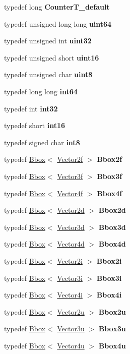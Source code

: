 \begin{DoxyCompactItemize}
typedef long {\bfseries Counter\+T\+\_\+default}
\item 
typedef unsigned long long {\bfseries uint64}
\item 
typedef unsigned int {\bfseries uint32}
\item 
typedef unsigned short {\bfseries uint16}
\item 
typedef unsigned char {\bfseries uint8}
\item 
typedef long long {\bfseries int64}
\item 
typedef int {\bfseries int32}
\item 
typedef short {\bfseries int16}
\item 
typedef signed char {\bfseries int8}
\item 
typedef \hyperlink{structcugar_1_1_bbox}{Bbox}$<$ \hyperlink{structcugar_1_1_vector}{Vector2f} $>$ {\bfseries Bbox2f}
\item 
typedef \hyperlink{structcugar_1_1_bbox}{Bbox}$<$ \hyperlink{structcugar_1_1_vector}{Vector3f} $>$ {\bfseries Bbox3f}
\item 
typedef \hyperlink{structcugar_1_1_bbox}{Bbox}$<$ \hyperlink{structcugar_1_1_vector}{Vector4f} $>$ {\bfseries Bbox4f}
\item 
typedef \hyperlink{structcugar_1_1_bbox}{Bbox}$<$ \hyperlink{structcugar_1_1_vector}{Vector2d} $>$ {\bfseries Bbox2d}
\item 
typedef \hyperlink{structcugar_1_1_bbox}{Bbox}$<$ \hyperlink{structcugar_1_1_vector}{Vector3d} $>$ {\bfseries Bbox3d}
\item 
typedef \hyperlink{structcugar_1_1_bbox}{Bbox}$<$ \hyperlink{structcugar_1_1_vector}{Vector4d} $>$ {\bfseries Bbox4d}
\item 
typedef \hyperlink{structcugar_1_1_bbox}{Bbox}$<$ \hyperlink{structcugar_1_1_vector}{Vector2i} $>$ {\bfseries Bbox2i}
\item 
typedef \hyperlink{structcugar_1_1_bbox}{Bbox}$<$ \hyperlink{structcugar_1_1_vector}{Vector3i} $>$ {\bfseries Bbox3i}
\item 
typedef \hyperlink{structcugar_1_1_bbox}{Bbox}$<$ \hyperlink{structcugar_1_1_vector}{Vector4i} $>$ {\bfseries Bbox4i}
\item 
typedef \hyperlink{structcugar_1_1_bbox}{Bbox}$<$ \hyperlink{structcugar_1_1_vector}{Vector2u} $>$ {\bfseries Bbox2u}
\item 
typedef \hyperlink{structcugar_1_1_bbox}{Bbox}$<$ \hyperlink{structcugar_1_1_vector}{Vector3u} $>$ {\bfseries Bbox3u}
\item 
typedef \hyperlink{structcugar_1_1_bbox}{Bbox}$<$ \hyperlink{structcugar_1_1_vector}{Vector4u} $>$ {\bfseries Bbox4u}

\end{DoxyCompactItemize}
